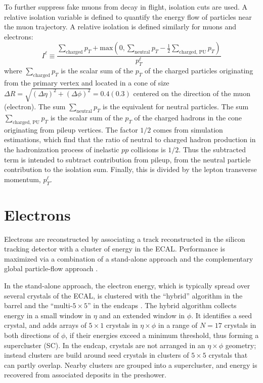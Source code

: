 To further suppress fake muons from decay in flight, isolation cuts are used. A relative isolation variable is defined to quantify the energy flow of particles near the muon trajectory.
A relative isolation is defined similarly for muons and electrons:
\begin{equation}
    I^\ell \equiv \frac{\sum_{\text{charged}} p_{T} + \text{max}\left( 0, \sum_{\text{neutral}} p_{T} - \frac{1}{2}  \sum_{\text{charged, PU}} p_{T}  \right)}{p_{T}^\ell}
    \label{eqn:definition-relative-isolation}
\end{equation}
where $\sum_{\text{charged}} p_{T}$ is the scalar sum of the $p_{T}$ of the charged particles originating from the primary vertex and located in a cone of size $\Delta R = \sqrt{(\Delta \eta)^2 + (\Delta \phi)^2} = 0.4 (0.3)$ centered on the direction of the muon (electron). The sum $\sum_{\text{neutral}} p_{T}$ is the equivalent for neutral particles. The sum $\sum_{\text{charged, PU}} p_{T}$ is the scalar sum of the $p_{T}$ of the charged hadrons in the cone originating from pileup vertices. The factor $1/2$ comes from simulation estimations, which find that the ratio of neutral to charged hadron production in the hadronization process of inelastic $pp$ collisions is $1/2$. Thus the subtracted term is intended to subtract contribution from pileup, from the neutral particle contribution to the isolation sum. Finally, this is divided by the lepton transverse momentum, $p_{T}^\ell$. 


\section{Electrons}
Electrons are reconstructed by associating a track reconstructed in the silicon tracking detector with a cluster of energy in the ECAL. Performance is maximized via a combination of a stand-alone approach and the complementary global particle-flow approach \citep{JINST-2015-10-P06005}. 

In the stand-alone approach, the electron energy, which is typically spread over several crystals of the ECAL, is clustered with the ``hybrid'' algorithm in the barrel and the ``multi-$5\times 5$'' in the endcaps \citep{JINST-2015-10-P06005}. The hybrid algorithm collects energy in a small window in $\eta$ and an extended window in $\phi$. It identifies a seed crystal, and adds arrays of $5 \times 1$ crystals in $\eta \times \phi$ in a range of $N = 17$ crystals in both directions of $\phi$, if their energies exceed a minimum threshold, thus forming a supercluster (SC).  In the endcap, crystals are not arranged in an $\eta \times \phi$ geometry; instead clusters are build around seed crystals in clusters of $5\times 5$ crystals that can partly overlap. Nearby clusters are grouped into a supercluster, and energy is recovered from associated deposits in the preshower. 

